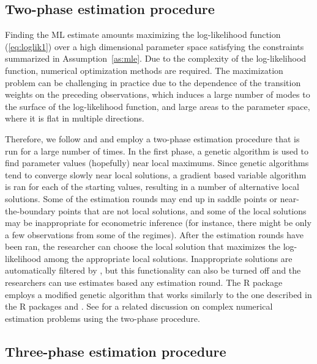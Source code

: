 \documentclass[nojss]{jss}
\begin{document}
\subsection{Two-phase estimation procedure}\label{sec:estimscheme}

Finding the ML estimate amounts maximizing the log-likelihood function (\ref{eq:loglik1}) over a high dimensional parameter space satisfying the constraints summarized in Assumption~\ref{as:mle}. Due to the complexity of the log-likelihood function, numerical optimization methods are required. The maximization problem can be challenging in practice due to the dependence of the transition weights on the preceding observations, which induces a large number of modes to the surface of the log-likelihood function, and large areas to the parameter space, where it is flat in multiple directions.

Therefore, we follow \cite{Meitz+Preve+Saikkonen:2023} and \cite{Virolainen:2022} and employ a two-phase estimation procedure that is run for a large number of times. In the first phase, a genetic algorithm is used to find parameter values (hopefully) near local maximums. Since genetic algorithms tend to converge slowly near local solutions, a gradient based variable algorithm \cite[algorithm 21, implemented by \citealp{R}]{Nash:1990} is ran for each of the starting values, resulting in a number of alternative local solutions. Some of the estimation rounds may end up in saddle points or near-the-boundary points that are not local solutions, and some of the local solutions may be  inappropriate for econometric inference (for instance, there might be only a few observations from some of the regimes). After the estimation rounds have been ran, the researcher can choose the local solution that maximizes the log-likelihood among the appropriate local solutions. Inappropriate solutions are automatically filtered by , but this functionality can also be turned off and the researchers can use estimates based any estimation round. The R package  employs a modified genetic algorithm that works similarly to the one described in the R packages  \citep{uGMAR} and  \citep{gmvarkit} \citep[the genetic algorithm and implemented in former is briefly described in][]{Virolainen:2022}. See \citet[Chapter~3]{Virolainen2:2022} for a related discussion on complex numerical estimation problems using the two-phase procedure.

\subsection{Three-phase estimation procedure}\label{sec:three-phase}
\end{document}
